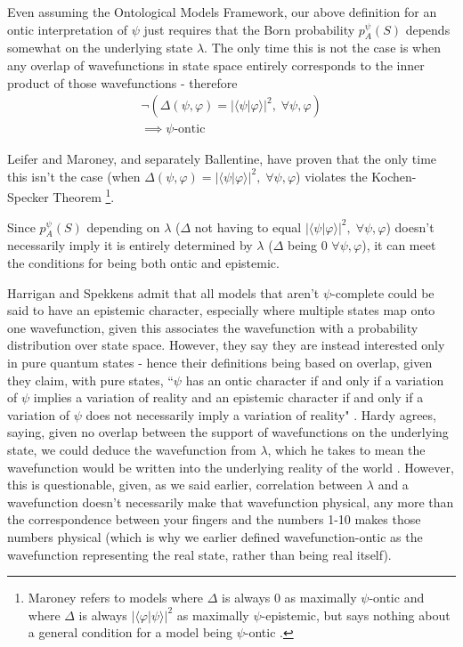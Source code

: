 \documentclass[superscriptaddress,reprint, floatfix, prl,nofootinbib]{revtex4-2}
\newcommand{\braket}[2]{\langle #1|#2 \rangle}
\begin{document}
Even assuming the Ontological Models Framework, our above definition for an ontic interpretation of $\psi$ just requires that the Born probability $p^\psi_A(S)$ depends somewhat on the underlying state $\lambda$. The only time this is not the case is when any overlap of wavefunctions in state space entirely corresponds to the inner product of those wavefunctions - therefore
\begin{equation}
\begin{split}
    \neg(\Delta(\psi,\varphi)=\vert\braket{\psi}{\varphi}\vert^2,\;\forall\psi,\varphi)\\
    \implies\psi\text{-ontic}
    \end{split}
\end{equation}

Leifer and Maroney, and separately Ballentine, have proven that the only time this isn't the case (when $\Delta(\psi,\varphi)=\vert\braket{\psi}{\varphi}\vert^2,\;\forall\psi,\varphi$) violates the Kochen-Specker Theorem \cite{Leifer2013MaxEpist,Ballentine2014Ontological} \footnote{Maroney refers to models where $\Delta$ is always 0 as maximally $\psi$-ontic and where $\Delta$ is always $\vert\braket{\varphi}{\psi}\vert^2$ as maximally $\psi$-epistemic, but says nothing about a general condition for a model being $\psi$-ontic \cite{Maroney2012Statistical}.}.

Since $p^\psi_A(S)$ depending on $\lambda$ ($\Delta$ not having to equal $\vert\braket{\psi}{\varphi}\vert^2,\;\forall\psi,\varphi$) doesn't necessarily imply it is entirely determined by $\lambda$ ($\Delta$ being 0 $\forall\psi,\varphi$), it can meet the conditions for being both ontic and epistemic.

Harrigan and Spekkens admit that all models that aren't $\psi$-complete could be said to have an epistemic character, especially where multiple states map onto one wavefunction, given this associates the wavefunction with a probability distribution over state space. However, they say they are instead interested only in pure quantum states - hence their definitions being based on overlap, given they claim, with pure states, ``$\psi$ has an ontic character if and only if a variation of $\psi$ implies a variation of reality and an epistemic character if and only if a variation of $\psi$ does not necessarily imply a variation of reality" \cite{Harrigan2010Nonlocality}. Hardy agrees, saying, given no overlap between the support of wavefunctions on the underlying state, we could deduce the wavefunction from $\lambda$, which he takes to mean the wavefunction would be written into the underlying reality of the world \cite{Hardy2013QStatesReal}. However, this is questionable, given, as we said earlier, correlation between $\lambda$ and a wavefunction doesn't necessarily make that wavefunction physical, any more than the correspondence between your fingers and the numbers 1-10 makes those numbers physical \cite{Schlosshauer2012Implications} (which is why we earlier defined wavefunction-ontic as the wavefunction representing the real state, rather than being real itself).
\end{document}

